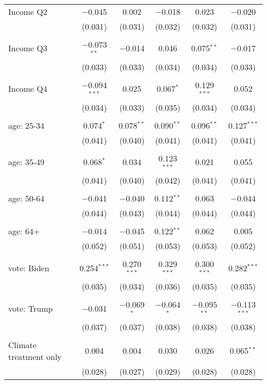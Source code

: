 \begin{tabular}{@{\extracolsep{5pt}}lccccc}
 Income Q2 & $-$0.045 & 0.002 & $-$0.018 & 0.023 & $-$0.020 \\ 
  & (0.031) & (0.031) & (0.032) & (0.032) & (0.031) \\ 
  & & & & & \\ 
 Income Q3 & $-$0.073$^{**}$ & $-$0.014 & 0.046 & 0.075$^{**}$ & $-$0.017 \\ 
  & (0.033) & (0.033) & (0.034) & (0.034) & (0.033) \\ 
  & & & & & \\ 
 Income Q4 & $-$0.094$^{***}$ & 0.025 & 0.067$^{*}$ & 0.129$^{***}$ & 0.052 \\ 
  & (0.034) & (0.033) & (0.035) & (0.034) & (0.034) \\ 
  & & & & & \\ 
 age: 25-34 & 0.074$^{*}$ & 0.078$^{**}$ & 0.090$^{**}$ & 0.096$^{**}$ & 0.127$^{***}$ \\ 
  & (0.041) & (0.040) & (0.041) & (0.041) & (0.041) \\ 
  & & & & & \\ 
 age: 35-49 & 0.068$^{*}$ & 0.034 & 0.123$^{***}$ & 0.021 & 0.055 \\ 
  & (0.041) & (0.040) & (0.042) & (0.041) & (0.041) \\ 
  & & & & & \\ 
 age: 50-64 & $-$0.041 & $-$0.040 & 0.112$^{**}$ & 0.063 & $-$0.044 \\ 
  & (0.044) & (0.043) & (0.044) & (0.044) & (0.044) \\ 
  & & & & & \\ 
 age: 64+ & $-$0.014 & $-$0.045 & 0.122$^{**}$ & 0.062 & 0.005 \\ 
  & (0.052) & (0.051) & (0.053) & (0.053) & (0.052) \\ 
  & & & & & \\ 
 vote: Biden & 0.254$^{***}$ & 0.270$^{***}$ & 0.329$^{***}$ & 0.300$^{***}$ & 0.282$^{***}$ \\ 
  & (0.035) & (0.034) & (0.036) & (0.035) & (0.035) \\ 
  & & & & & \\ 
 vote: Trump & $-$0.031 & $-$0.069$^{*}$ & $-$0.064$^{*}$ & $-$0.095$^{**}$ & $-$0.113$^{***}$ \\ 
  & (0.037) & (0.037) & (0.038) & (0.038) & (0.038) \\ 
  & & & & & \\ 
 Climate treatment only & 0.004 & 0.004 & 0.030 & 0.026 & 0.065$^{**}$ \\ 
  & (0.028) & (0.027) & (0.029) & (0.028) & (0.028) \\ 

\end{tabular}
